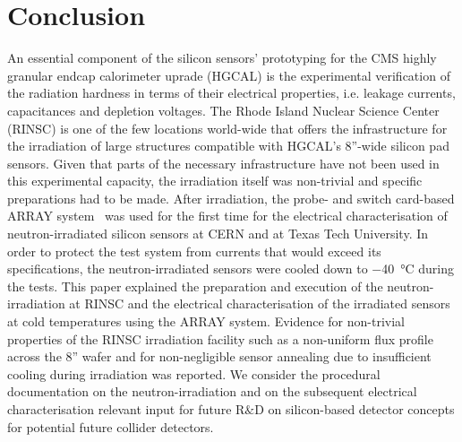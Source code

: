 \section{Conclusion}
\label{sec:conclusion}
An essential component of the silicon sensors' prototyping for the CMS highly granular endcap calorimeter uprade (HGCAL) is the experimental verification of the radiation hardness in terms of their electrical properties, i.e. leakage currents, capacitances and depletion voltages.
The Rhode Island Nuclear Science Center (RINSC) is one of the few locations world-wide that offers the infrastructure for the irradiation of large structures compatible with HGCAL's 8''-wide silicon pad sensors.
Given that parts of the necessary infrastructure have not been used in this experimental capacity, the irradiation itself was non-trivial and specific preparations had to be made.
After irradiation, the probe- and switch card-based ARRAY system~\cite{pitters:array2019} was used for the first time for the electrical characterisation of neutron-irradiated silicon sensors at CERN and at Texas Tech University.
In order to protect the test system from currents that would exceed its specifications, the neutron-irradiated sensors were cooled down to \SI{-40}{\celsius} during the tests.%
This paper explained the preparation and execution of the neutron-irradiation at RINSC and the electrical characterisation of the irradiated sensors at cold temperatures using the ARRAY system.
Evidence for non-trivial properties of the RINSC irradiation facility such as a non-uniform flux profile across the 8'' wafer and for non-negligible sensor annealing due to insufficient cooling during irradiation was reported.
We consider the procedural documentation on the neutron-irradiation and on the subsequent electrical characterisation relevant input for future R$\&$D on silicon-based detector concepts for potential future collider detectors.%
